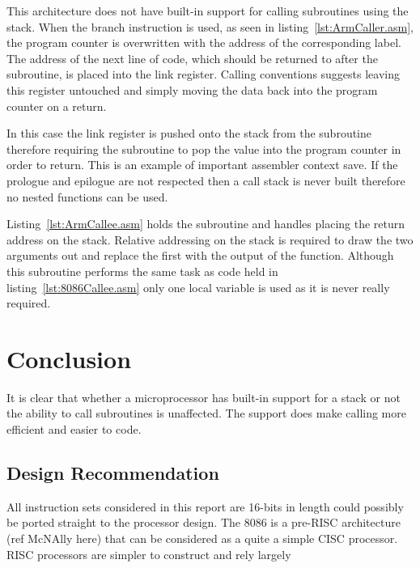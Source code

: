 \documentclass[12pt,a4paper]{article}
\begin{document}
This architecture does not have built-in support for calling subroutines using the stack.
When the branch instruction is used, as seen in listing~\ref{lst:ArmCaller.asm}, the program counter is overwritten with the address of the corresponding label.
The address of the next line of code, which should be returned to after the subroutine, is placed into the link register.
Calling conventions suggests leaving this register untouched and simply moving the data back into the program counter on a return.



In this case the link register is pushed onto the stack from the subroutine therefore requiring the subroutine to pop the value into the program counter in order to return.
This is an example of important assembler context save.
If the prologue and epilogue are not respected then a call stack is never built therefore no nested functions can be used.

Listing~\ref{lst:ArmCallee.asm} holds the subroutine and handles placing the return address on the stack.
Relative addressing on the stack is required to draw the two arguments out and replace the first with the output of the function.
Although this subroutine performs the same task as code held in listing~\ref{lst:8086Callee.asm} only one local variable is used as it is never really required.







\section{Conclusion}

It is clear that whether a microprocessor has built-in support for a stack or not the ability to call subroutines is unaffected.
The support does make calling more efficient and easier to code.

\subsection{Design Recommendation}
All instruction sets considered in this report are 16-bits in length could possibly be ported straight to the processor design.
The 8086 is a pre-RISC architecture (ref McNAlly here) that can be considered as a quite a simple CISC processor.
RISC processors are simpler to construct and rely largely   
\end{document}
